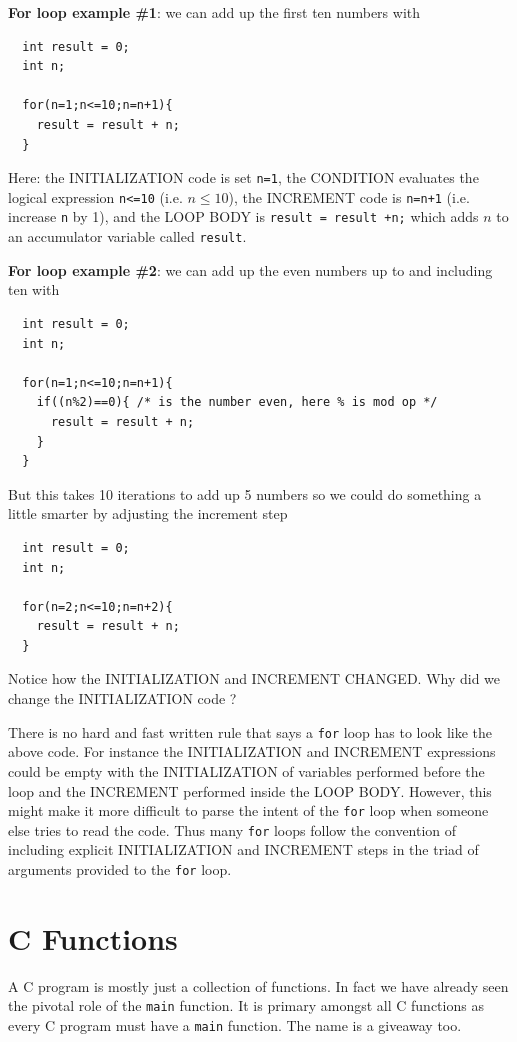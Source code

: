 {\bf For loop example \#1}: we can add up the first ten numbers with
\begin{verbatim}
  int result = 0;
  int n;
  
  for(n=1;n<=10;n=n+1){
    result = result + n;
  }
\end{verbatim}

Here: the INITIALIZATION code is set \texttt{n=1}, the CONDITION evaluates the logical expression \texttt{n<=10} (i.e. $n\leq 10$), the INCREMENT code is \texttt{n=n+1} (i.e. increase \texttt{n} by 1), and the LOOP BODY is \texttt{result = result +n;} which adds $n$ to an accumulator variable called \texttt{result}.

{\bf For loop example \#2}: we can add up the even numbers up to and including ten with
\begin{verbatim}
  int result = 0;
  int n;
  
  for(n=1;n<=10;n=n+1){
    if((n%2)==0){ /* is the number even, here % is mod op */
      result = result + n;
    }
  }
\end{verbatim}
But this takes 10 iterations to add up 5 numbers so we could do something a little smarter by adjusting the increment step
\begin{verbatim}
  int result = 0;
  int n;
  
  for(n=2;n<=10;n=n+2){
    result = result + n;
  }
\end{verbatim}
Notice how the INITIALIZATION and INCREMENT CHANGED. Why did we change the INITIALIZATION code ?

There is no hard and fast written rule that says a \texttt{for} loop has to look like the above code. For instance the INITIALIZATION and INCREMENT expressions could be empty with the INITIALIZATION of variables performed before the loop and the INCREMENT performed inside the LOOP BODY. However, this might make it more difficult to parse the intent of the \texttt{for} loop when someone else tries to read the code. Thus many \texttt{for} loops follow the convention of including explicit INITIALIZATION and INCREMENT steps in the triad of arguments provided to the \texttt{for} loop.

\section{C Functions}

A C program is mostly just a collection of functions. In fact we have already seen the pivotal role of the \texttt{main} function. It is primary amongst all C functions as every C program must have a \texttt{main} function. The name is a giveaway too.

